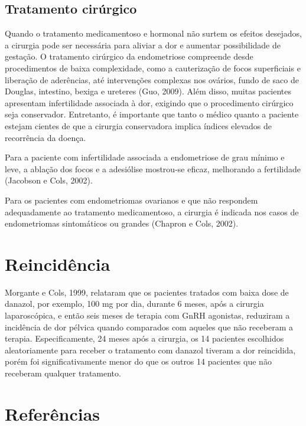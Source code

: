 \documentclass[12pt]{article} %
\begin{document}
\subsection{Tratamento cirúrgico}

Quando o tratamento medicamentoso e hormonal não surtem os efeitos
desejados, a cirurgia pode ser necessária para aliviar a dor e
aumentar possibilidade de gestação.  O tratamento cirúrgico da
endometriose compreende desde procedimentos de baixa complexidade,
como a cauterização de focos superficiais e liberação de aderências, até
intervenções complexas nos ovários, fundo de saco de Douglas,
intestino, bexiga e ureteres (Guo, 2009). Além disso, muitas pacientes
apresentam infertilidade associada à dor, exigindo que o procedimento
cirúrgico seja conservador. Entretanto, é importante que tanto o
médico quanto a paciente estejam cientes de que a cirurgia
conservadora implica índices elevados de recorrência da doença. %

Para a paciente com infertilidade associada a endometriose de grau
mínimo e leve, a ablação dos focos e a adesiólise mostrou-se eficaz,
melhorando a fertilidade (Jacobson e Cols, 2002).

Para os pacientes com endometriomas ovarianos e que não respondem
adequadamente ao tratamento medicamentoso, a cirurgia é indicada nos
casos de endometriomas sintomáticos ou grandes (Chapron e Cols, 2002).

\section{Reincidência}

Morgante e Cols, 1999, relataram que os pacientes tratados com baixa
dose de danazol, por exemplo, 100 mg por dia, durante 6 meses, após a
cirurgia laparoscópica, e então seis meses de terapia com GnRH
agonistas, reduziram a incidência de dor pélvica quando comparados com
aqueles que não receberam a terapia. Especificamente, 24 meses após a
cirurgia, os 14 pacientes escolhidos aleatoriamente para receber o
tratamento com danazol tiveram a dor reincidida, porém foi
significativamente menor do que os outros 14 pacientes que não
receberam qualquer tratamento.

\section{Referências} 
\end{document}
